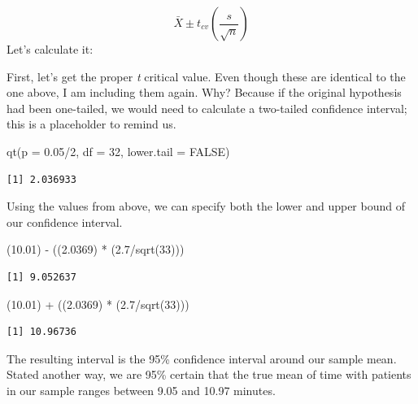 \documentclass[
  11pt,
]{book}
\newenvironment{Shaded}{\begin{snugshade}}{\end{snugshade}}
\newcommand{\AttributeTok}[1]{\textcolor[rgb]{0.77,0.63,0.00}{#1}}
\newcommand{\ConstantTok}[1]{\textcolor[rgb]{0.00,0.00,0.00}{#1}}
\newcommand{\DecValTok}[1]{\textcolor[rgb]{0.00,0.00,0.81}{#1}}
\newcommand{\FloatTok}[1]{\textcolor[rgb]{0.00,0.00,0.81}{#1}}
\newcommand{\FunctionTok}[1]{\textcolor[rgb]{0.00,0.00,0.00}{#1}}
\newcommand{\NormalTok}[1]{#1}
\newcommand{\SpecialCharTok}[1]{\textcolor[rgb]{0.00,0.00,0.00}{#1}}
\begin{document}
\[\bar{X} \pm t_{cv}(\frac{s}{\sqrt{n}})\]
Let's calculate it:

First, let's get the proper \emph{t} critical value. Even though these are identical to the one above, I am including them again. Why? Because if the original hypothesis had been one-tailed, we would need to calculate a two-tailed confidence interval; this is a placeholder to remind us.

\begin{Shaded}
\begin{Highlighting}[]
\FunctionTok{qt}\NormalTok{(}\AttributeTok{p =} \FloatTok{0.05}\SpecialCharTok{/}\DecValTok{2}\NormalTok{, }\AttributeTok{df =} \DecValTok{32}\NormalTok{, }\AttributeTok{lower.tail =} \ConstantTok{FALSE}\NormalTok{)}
\end{Highlighting}
\end{Shaded}

\begin{verbatim}
[1] 2.036933
\end{verbatim}

Using the values from above, we can specify both the lower and upper bound of our confidence interval.

\begin{Shaded}
\begin{Highlighting}[]
\NormalTok{(}\FloatTok{10.01}\NormalTok{) }\SpecialCharTok{{-}}\NormalTok{ ((}\FloatTok{2.0369}\NormalTok{) }\SpecialCharTok{*}\NormalTok{ (}\FloatTok{2.7}\SpecialCharTok{/}\FunctionTok{sqrt}\NormalTok{(}\DecValTok{33}\NormalTok{)))}
\end{Highlighting}
\end{Shaded}

\begin{verbatim}
[1] 9.052637
\end{verbatim}

\begin{Shaded}
\begin{Highlighting}[]
\NormalTok{(}\FloatTok{10.01}\NormalTok{) }\SpecialCharTok{+}\NormalTok{ ((}\FloatTok{2.0369}\NormalTok{) }\SpecialCharTok{*}\NormalTok{ (}\FloatTok{2.7}\SpecialCharTok{/}\FunctionTok{sqrt}\NormalTok{(}\DecValTok{33}\NormalTok{)))}
\end{Highlighting}
\end{Shaded}

\begin{verbatim}
[1] 10.96736
\end{verbatim}

The resulting interval is the 95\% confidence interval around our sample mean. Stated another way, we are 95\% certain that the true mean of time with patients in our sample ranges between 9.05 and 10.97 minutes.
\end{document}
